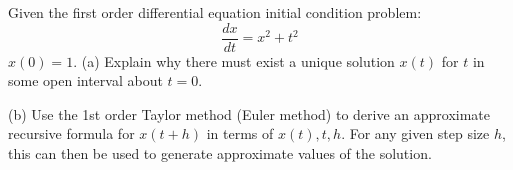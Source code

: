 \documentclass[12pt]{article}
\begin{document}
\newpage

Given the first order differential equation initial condition problem:
$$
\frac{dx}{dt} = x^2+t^2
$$
$x(0)=1$.
(a) Explain why there must exist a unique solution $x(t)$ for $t$ in some open interval about $t=0$. 

\vspace{2 in}

\noindent
(b) Use the 1st order Taylor method (Euler method) to derive an approximate recursive formula for 
$x(t+h)$ in terms of $x(t),t,h$. For any given step size $h$, this can then be used to generate approximate values of the solution.


\problemsdone
\end{document}
